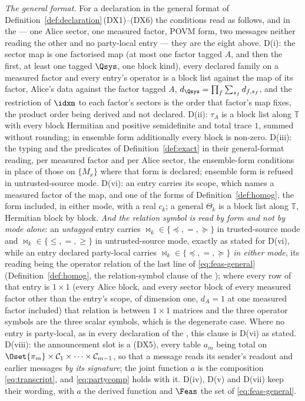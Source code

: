 \begin{definition}
\emph{The general format.} For a declaration in the general format of
Definition~\ref{def:declaration}\,(DX1)--(DX6) the conditions read as
follows, and in the  --- one Alice sector, one measured
factor, POVM form, two messages neither reading the other and no party-local
entry --- they are the eight above.
D(i): the sector map is one factorised map (at most one factor tagged $A$,
and then the first, at least one tagged $\Qsys$, one block kind), every
declared family on a measured factor and every entry's operator is a block
list against the map of its factor, Alice's data against the factor tagged
$A$, $d_{\Qsys}=\prod_f\sum_{s_f}d_{f,s_f}$, and the restriction of $\idxm$
to each factor's sectors is the order that factor's map fixes, the product
order being derived and not declared. D(ii): $\tau_A$ is a block list along
$\mathbb{T}$ with every block Hermitian and positive semidefinite and total
trace $1$, summed without rounding; in ensemble form additionally every
block is non-zero. D(iii): the typing and the predicates of
Definition~\ref{def:exact} in their general-format reading, per measured
factor and per Alice sector, the ensemble-form conditions in place of those
on $\{M_x\}$ where that form is declared; ensemble form is refused in
untrusted-source mode. D(vi): an entry carries its scope, which names a
measured factor of the map, and one of the forms of
Definition~\ref{def:homog}, the  form included, in either
mode, with a real $c_k$; a general $\Theta_k$ is a block list along
$\mathbb{T}$, Hermitian block by block. \emph{And the relation symbol is
read by form and not by mode alone}: an \emph{untagged} entry carries
$\bowtie_k\in\{\preceq,=,\succeq\}$ in trusted-source mode and
$\bowtie_k\in\{\le,=,\ge\}$ in untrusted-source mode, exactly as stated for
D(vi), while an entry declared party-local carries
$\bowtie_k\in\{\preceq,=,\succeq\}$ \emph{in either mode}, its reading being
the operator relation of the last line of \eqref{eq:feas-general}
(Definition~\ref{def:homog}, the relation-symbol clause of the ); where every row of that entry is $1\times1$ (every Alice block, and
every sector block of every measured factor other than the entry's scope, of
dimension one, $d_A=1$ at one measured factor included) that relation is
between $1\times1$ matrices and the three operator symbols are the three
scalar symbols, which is the degenerate case. Where no entry is party-local,
as in every declaration of the , this clause is D(vi) as
stated. D(viii): the announcement slot is a  (DX5),
every table $a_m$ being total on
$\Oset{\pi_m}\times\mathcal{C}_1\times\dots\times\mathcal{C}_{m-1}$, so that
a message reads its sender's readout and earlier messages \emph{by its
signature}; the joint function $a$ is the composition \eqref{eq:transcript},
and \eqref{eq:partycomp} holds with it. D(iv), D(v) and D(vii) keep their
wording, with $a$ the derived function and $\Feas$ the set of
\eqref{eq:feas-general}.
\end{definition}
